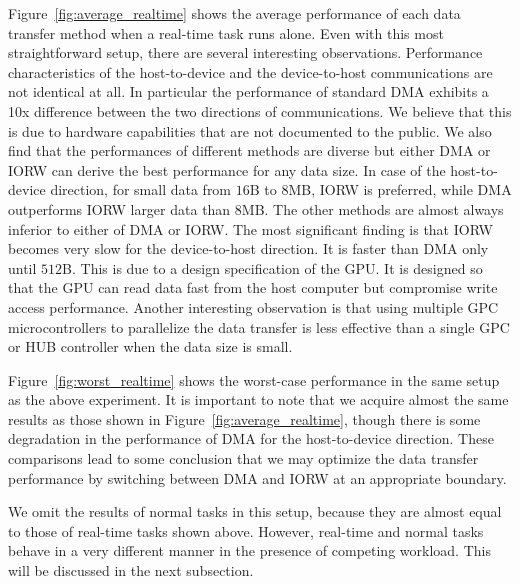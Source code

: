 Figure~\ref{fig:average_realtime} shows the average performance of each
data transfer method when a real-time task runs alone.
Even with this most straightforward setup, there are several interesting
observations.
Performance characteristics of the host-to-device and the device-to-host
communications are not identical at all.
In particular the performance of standard DMA exhibits a 10x difference
between the two directions of communications.
We believe that this is due to hardware capabilities that are not
documented to the public.
We also find that the performances of different methods are diverse but
either \textsf{DMA} or \textsf{IORW} can derive the best performance for
any data size.
In case of the host-to-device direction, for small data from $16$B to
$8$MB, \textsf{IORW} is preferred, while \textsf{DMA} outperforms
\textsf{IORW} larger data than $8$MB.
The other methods are almost always inferior to either of \textsf{DMA}
or \textsf{IORW}.
The most significant finding is that \textsf{IORW} becomes very slow for
the device-to-host direction.
It is faster than \textsf{DMA} only until $512$B.
This is due to a design specification of the GPU.
It is designed so that the GPU can read data fast from the host computer
but compromise write access performance.
Another interesting observation is that using multiple GPC
microcontrollers to parallelize the data transfer is less effective than
a single GPC or HUB controller when the data size is small.

Figure~\ref{fig:worst_realtime} shows the worst-case performance in
the same setup as the above experiment.
It is important to note that we acquire almost the same results as those
shown in Figure~\ref{fig:average_realtime}, though there is
some degradation in the performance of \textsf{DMA} for the
host-to-device direction.
These comparisons lead to some conclusion that we may optimize the data
transfer performance by switching between \textsf{DMA} and \textsf{IORW}
at an appropriate boundary.

We omit the results of normal tasks in this setup, because they are
almost equal to those of real-time tasks shown above.
However, real-time and normal tasks behave in a very different manner in
the presence of competing workload.
This will be discussed in the next subsection.

